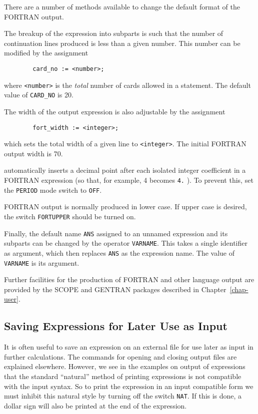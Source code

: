There are a number of methods available to change the default format of the
FORTRAN output.

The breakup of the expression into subparts is such that the number of
continuation lines produced is less than a given number. This number can
be modified by the assignment
\begin{verbatim}
        card_no := <number>;
\end{verbatim}
where {\tt <number>} is the {\em total\/} number of cards allowed in a
statement. The default value of {\tt CARD\_NO} is 20.

The width of the output expression is also adjustable by the assignment
\begin{verbatim}
        fort_width := <integer>;
\end{verbatim}
 which sets the total width of a given line to
{\tt <integer>}.  The initial FORTRAN output width is 70.

{\REDUCE} automatically inserts a decimal point after each isolated integer
coefficient in a FORTRAN expression (so that, for example, 4 becomes
{\tt 4.} ). To prevent this, set the {\tt PERIOD}
mode switch to {\tt OFF}.

FORTRAN output is normally produced in lower case.  If upper case is desired,
the switch {\tt FORTUPPER} should be turned on.

Finally, the default name {\tt ANS} assigned to an unnamed expression and
its subparts can be changed by the operator {\tt VARNAME}.
  This takes a single identifier as argument, which then
replaces {\tt ANS} as the expression name.  The value of {\tt VARNAME} is
its argument.

Further facilities for the production of FORTRAN and other language output
are provided by the SCOPE and GENTRAN packages described in
Chapter~\ref{chap-user}.

\subsection{Saving Expressions for Later Use as Input}

It is often useful to save an expression on an external file for use later
as input in further calculations. The commands for opening and closing
output files are explained elsewhere. However, we see in the examples on
output of expressions that the standard ``natural'' method of printing
expressions is not compatible with the input syntax. So to print the
expression in an input compatible form we must inhibit this natural style
by turning off the switch {\tt NAT}. If this is done, a
dollar sign will also be printed at the end of the expression.


